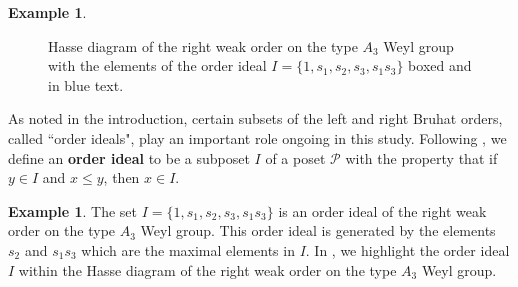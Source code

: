 \documentclass{amsart}
\theoremstyle{definition}
\newtheorem{example}[theorem]{Example}
\newcommand{\defn}[1]{\textbf{#1}}
\begin{document}
\begin{example}
\begin{figure}[htp]
\caption{Hasse diagram of the right weak order on the type $A_3$ Weyl group with the elements of the order ideal $I=\{1,s_1,s_2,s_3,s_1s_3\}$ boxed and in blue text.}
\label{fig:HasseDiagram}
\end{figure}
\end{example}

As noted in the introduction, certain subsets of the left and right Bruhat orders, called ``order ideals", play an important role ongoing in this study. Following \cite[p.\ 282]{EC1}, we define an \defn{order ideal} to be a subposet $I$ of a poset $\mathcal{P}$ with the property that if $y\in I$ and $x\leq y$, then $x\in I$.



\begin{example}\label{Ex: right weak order} 
The set $I=\{1,s_1,s_2,s_3,s_1s_3\}$ is 
an order ideal of the right weak order on the type $A_3$ Weyl group.
This order ideal is generated by the elements $s_2$ and $s_1s_3$ which are the maximal elements in $I$.
In , we highlight the order ideal 
$I$ within the Hasse diagram of the right weak order on the type $A_3$ Weyl group. 
 \end{example}
\end{document}
